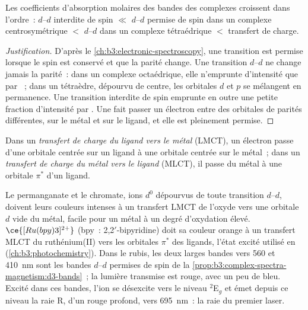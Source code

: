 \begin{proposition}\label{prop:b3:complex-spectra-magnetism:intensity-order}
Les coefficients d'absorption molaires des bandes des complexes croissent
dans l'ordre~: $d$--$d$ interdite de spin $\ll$ $d$--$d$ permise de spin
dans un complexe centrosymétrique $<$ $d$--$d$ dans un complexe
tétraédrique $<$ transfert de charge.
\end{proposition}

\begin{proof}[Justification]
D'après le \cref{ch:b3:electronic-spectroscopy}, une transition est permise
lorsque le spin est conservé et que la parité change. Une transition $d$--$d$
ne change jamais la parité~: dans un complexe octaédrique, elle n'emprunte
d'intensité que par ~; dans un tétraèdre, dépourvu de
centre, les orbitales $d$ et $p$ se mélangent en permanence. Une
transition interdite de spin emprunte en outre une petite fraction
d'intensité par . Une  fait passer un électron entre des orbitales de parités différentes,
sur le métal et sur le ligand, et elle est pleinement permise.
\end{proof}

\begin{definition}\label{def:b3:complex-spectra-magnetism:ct}
Dans un \emph{transfert de charge du ligand vers le métal}
(LMCT), un électron passe d'une orbitale centrée sur un ligand à une
orbitale centrée sur le métal~; dans un \emph{transfert de charge du métal vers le ligand}
(MLCT), il passe du métal à une orbitale $\pi^*$ d'un ligand.
\end{definition}

Le permanganate et le chromate, ions $d^0$ dépourvus de toute transition
$d$--$d$, doivent leurs couleurs intenses à un transfert LMCT de l'oxyde vers
une orbitale $d$ vide du métal, facile pour un métal à un degré d'oxydation
élevé. $\ce{[Ru(bpy)3]^{2+}}$ (bpy~: 2,2$'$-bipyridine) doit sa couleur
orange à un transfert MLCT du ruthénium(II) vers les orbitales $\pi^*$ des
ligands, l'état excité utilisé en 
(\cref{ch:b3:photochemistry}). Dans le rubis, les deux larges bandes vers
560 et \qty{410}{nm} sont les bandes $d$--$d$ permises de spin de la
\cref{prop:b3:complex-spectra-magnetism:d3-bands}~; la lumière transmise est
rouge, avec un peu de bleu. Excité dans ces bandes, l'ion se désexcite vers
le niveau $^2$E$_g$ et émet depuis ce niveau la raie R, d'un rouge profond,
vers \qty{695}{nm}~: la raie du premier laser.


